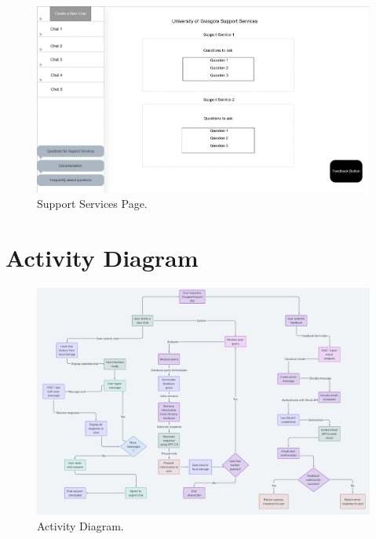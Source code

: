 \documentclass{l4proj}
\begin{document}
\begin{appendices}
\begin{figure}[h!]
  \centering
  \begin{adjustbox}{center,max height=0.4\textheight, max width=\linewidth}
    \includegraphics{images/wireframesupppage.png}
  \end{adjustbox}
  \caption{Support Services Page.}
\end{figure}

\chapter{Activity Diagram}
\label{Activity Diagram}

\begin{figure}[h!]
  \centering
  \begin{adjustbox}{center,max height=0.60\textheight, max width=\linewidth}
    \includegraphics{images/activitydiagram.png}
  \end{adjustbox}
  \caption{Activity Diagram.}
  \label{fig:activitydiagram}
\end{figure}


\end{appendices}
\end{document}
